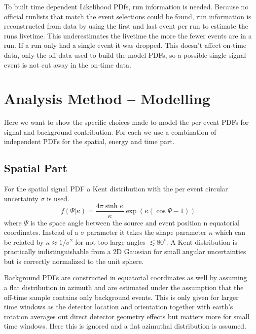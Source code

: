 To built time dependent Likelihood PDfs, run information is needed.
Because no official runlists that match the event selections could be found, run information is reconstructed from data by using the first and last event per run to estimate the runs livetime.
This underestimates the livetime the more the fewer events are in a run.
If a run only had a single event it was dropped.
This doesn't affect on-time data, only the off-data used to build the model PDFs, so a possible single signal event is not cut away in the on-time data.







\section{Analysis Method – Modelling}
Here we want to show the specific choices made to model the per event PDFs for signal and background contribution.
For each we use a combination of independent PDFs for the spatial, energy and time part.

\subsection{Spatial Part}
For the spatial signal PDF a Kent distribution with the per event circular uncertainty $\sigma$ is used.
\begin{equation}
  f(\Psi | \kappa) = \frac{4\pi\sinh\kappa}{\kappa}
    \exp\left(\kappa (\cos\Psi - 1)\right)
\end{equation}
where $\Psi$ is the space angle between the source and event position n equatorial coordinates.
Instead of a $\sigma$ parameter it takes the shape parameter $\kappa$ which can be related by $\kappa \approx 1 / \sigma^2$ for not too large angles $\lesssim 80^\circ$.
A Kent distribution is practically indistinguishable from a 2D Gaussian for small angular uncertainties but is correctly normalized to the unit sphere.

Background PDFs are constructed in equatorial coordinates as well by assuming a flat distribution in azimuth and are estimated under the assumption that the off-time sample contains only background events.
This is only given for larger time windows as the detector location and orientation together with earth's rotation averages out direct detector geometry effects but matters more for small time windows.
Here this is ignored and a flat azimuthal distribution is assumed.


